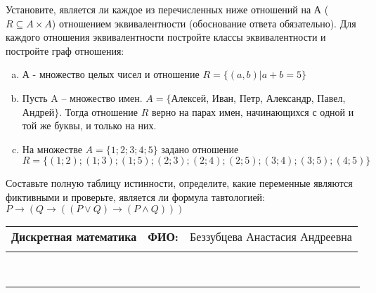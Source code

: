 \documentclass[10pt]{exam}
\newcommand{\class}{Дискретная математика}
\newcommand{\examdate}{}
\begin{document}
\begin{questions}
\question
Установите, является ли каждое из перечисленных ниже отношений на А ($R \subseteq A \times A$) отношением эквивалентности (обоснование ответа обязательно). Для каждого отношения эквивалентности постройте классы 
эквивалентности и постройте граф отношения:
\begin{enumerate} [a)]\setcounter{enumi}{0}
\item А - множество целых чисел и отношение $R = \{(a,b)|a + b = 5\}$
\item Пусть A – множество имен. $A = \{ $Алексей, Иван, Петр, Александр, Павел, Андрей$ \}$. Тогда отношение $R $ верно на парах имен, начинающихся с одной и той же буквы, и только на них.
\item На множестве $A = \{1; 2; 3; 4; 5\}$ задано отношение $R = \{(1; 2); (1; 3); (1; 5); (2; 3); (2; 4); (2; 5); (3; 4); (3; 5); (4; 5)\}$
\end{enumerate}\question Составьте полную таблицу истинности, определите, какие переменные являются фиктивными и проверьте, является ли формула тавтологией:
$ P \rightarrow (Q \rightarrow ((P \lor Q) \rightarrow (P \land Q)))$

\end{questions}
\newpage
\begin{flushright}
\begin{tabular}{p{2.8in} r l}
\textbf{\class} & \textbf{ФИО:} &Беззубцева Анастасия Андреевна
\\

\textbf{\examdate} &&\\
\end{tabular}\\
\end{flushright}
\rule[1ex]{\textwidth}{.1pt}
\end{document}

